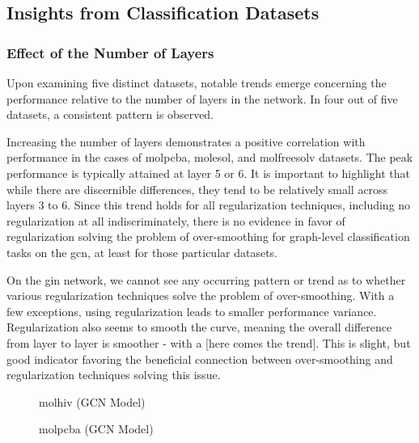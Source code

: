\subsection{Insights from Classification Datasets}
\subsubsection{Effect of the Number of Layers}
Upon examining five distinct datasets, notable trends emerge concerning the performance relative to the number of layers in the network. In four out of five datasets, a consistent pattern is observed.

Increasing the number of layers demonstrates a positive correlation with performance in the cases of molpcba, molesol, and molfreesolv datasets. The peak performance is typically attained at layer 5 or 6. It is important to highlight that while there are discernible differences, they tend to be relatively small across layers 3 to 6. Since this trend holds for all regularization techniques, including no regularization at all indiscriminately, there is no evidence in favor of regularization solving the problem of over-smoothing for graph-level classification tasks on the \ac{gcn}, at least for those particular datasets.

On the \ac{gin} network, we cannot see any occurring pattern or trend as to whether various regularization techniques solve the problem of over-smoothing. With a few exceptions, using regularization leads to smaller performance variance. Regularization also seems to smooth the curve, meaning the overall difference from layer to layer is smoother - with a [here comes the trend]. This is slight, but
good indicator favoring the beneficial connection between over-smoothing and regularization techniques solving this issue.





\begin{figure}
    \centering
    \caption{molhiv (GCN Model)}
    \label{fig:gcn-molfreesolv}
\end{figure}

\begin{figure}
    \centering
    \caption{molpcba (GCN Model)}
    \label{fig:gcn-molfreesolv}
\end{figure}


